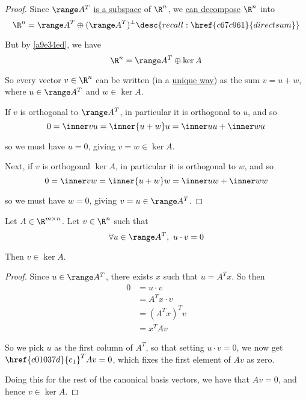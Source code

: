 \begin{proof}
  Since $\range A^T$ \href{d0afc28}{is a subspace} of $\R^n$, we
  \href{e77e5ea}{can decompose} $\R^n$ into
  $$
    \R^n=\range A^T\oplus(\range A^T)^\perp\desc{recall: \href{c67c961}{direct sum}}
  $$

  But by \autoref{a9e34ed}, we have
  $$
    \R^n=\range A^T\oplus\ker A
  $$

  So every vector $v\in\R^n$ can be written (in a \href{ab66b9d}{unique way})
  as the sum $v=u+w$, where $u\in\range A^T$ and $w\in\ker A$.

  If $v$ is orthogonal to $\range A^T$, in particular it is orthogonal to $u$,
  and so
  \begin{equation*}
    0=\inner vu=\inner{u+w}u=\inner uu+\inner wu
  \end{equation*}

  so we must have $u=0$, giving $v=w\in\ker A$.

  Next, if $v$ is orthogonal $\ker A$, in particular it is orthogonal to $w$,
  and so
  \begin{equation*}
    0=\inner vw=\inner{u+w}w=\inner uw+\inner ww
  \end{equation*}

  so we must have $w=0$, giving $v=u\in\range A^T$.
\end{proof}

\label{b2520ce}

Let $A\in\R^{m\times n}$. Let $v\in\R^n$ such that
$$
  \forall u\in\range A^T,\ u\cdot v=0
$$

Then $v\in\ker A$.

\begin{proof}
  Since $u\in\range A^T$, there exists $x$ such that $u=A^Tx$. So then
  \begin{align*}
    0 &=u\cdot v    \\
      &=A^Tx\cdot v \\
      &=(A^Tx)^Tv   \\
      &=x^TAv
  \end{align*}

  So we pick $u$ as the first column of $A^T$, so that setting $u\cdot v=0$, we
  now get $\href{c01037d}{e_1}^TAv=0$, which fixes the first element of $Av$ as
  zero.

  Doing this for the rest of the canonical basis vectors, we have that $Av=0$,
  and hence $v\in\ker A$.
\end{proof}

